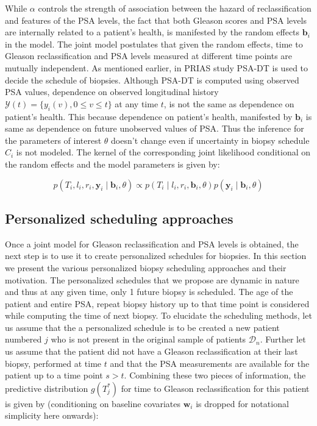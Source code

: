 While $\alpha$ controls the strength of association between the hazard of reclassification and features of the PSA levels, the fact that both Gleason scores and PSA levels are internally related to a patient's health, is manifested by the random effects $\boldsymbol{b}_i$ in the model. The joint model postulates that given the random effects, time to Gleason reclassification and PSA levels measured at different time points are mutually independent. As mentioned earlier, in PRIAS study PSA-DT is used to decide the schedule of biopsies. Although PSA-DT is computed using observed PSA values, dependence on observed longitudinal history $\mathcal{Y}(t) = \{y_i(v), 0\leq v \leq t\}$ at any time $t$, is not the same as dependence on patient's health. This because dependence on patient's health, manifested by $\boldsymbol{b}_i$ is same as dependence on future unobserved values of PSA. Thus the inference for the parameters of interest $\theta$ doesn't change even if uncertainty in biopsy schedule $C_i$ is not modeled. The kernel of the corresponding joint likelihood conditional on the random effects and the model parameters is given by:

\begin{equation*}
p(T_i, l_i, r_i, \boldsymbol{y}_i \mid \boldsymbol{b}_i, \theta) \propto p(T_i \mid l_i, r_i, \boldsymbol{b}_i, \theta) p(\boldsymbol{y}_i \mid \boldsymbol{b}_i, \theta)
\end{equation*}

\subsection{Personalized scheduling approaches}
\label{subsec : pers_sched_approaches}
Once a joint model for Gleason reclassification and PSA levels is obtained, the next step is to use it to create personalized schedules for biopsies. In this section we present the various personalized biopsy scheduling approaches and their motivation. The personalized schedules that we propose are dynamic in nature and thus at any given time, only 1 future biopsy is scheduled. The age of the patient and entire PSA, repeat biopsy history up to that time point is considered while computing the time of next biopsy. To elucidate the scheduling methods, let us assume that the a personalized schedule is to be created a new patient numbered $j$ who is not present in the original sample of patients $\mathcal{D}_n$. Further let us assume that the patient did not have a Gleason reclassification at their last biopsy, performed at time $t$ and that the PSA measurements are available for the patient up to a time point $s > t$. Combining these two pieces of information, the predictive distribution $g(T^*_j)$ for time to Gleason reclassification for this patient is given by (conditioning on baseline covariates $\boldsymbol{w}_i$ is dropped for notational simplicity here onwards):

